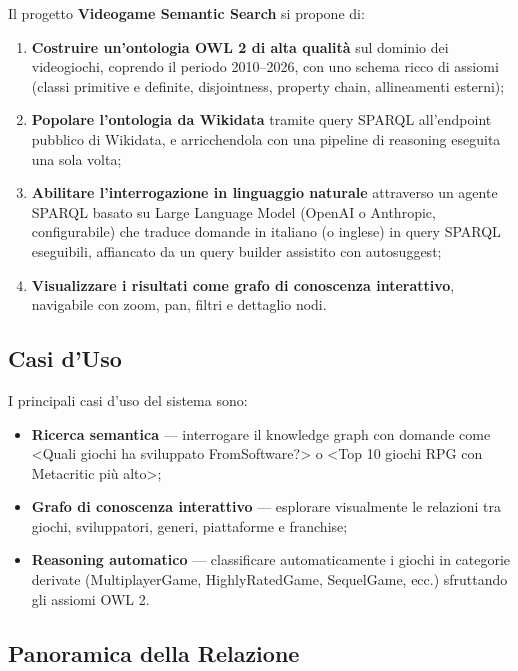 Il progetto \textbf{Videogame Semantic Search} si propone di:
\begin{enumerate}[nosep]
  \item \textbf{Costruire un'ontologia OWL 2 di alta qualit\`a} sul dominio dei videogiochi, coprendo il periodo 2010--2026, con uno schema ricco di assiomi (classi primitive e definite, disjointness, property chain, allineamenti esterni);
  \item \textbf{Popolare l'ontologia da Wikidata} tramite query SPARQL all'endpoint pubblico di Wikidata, e arricchendola con una pipeline di reasoning eseguita una sola volta;
  \item \textbf{Abilitare l'interrogazione in linguaggio naturale} attraverso un agente SPARQL basato su Large Language Model (OpenAI o Anthropic, configurabile) che traduce domande in italiano (o inglese) in query SPARQL eseguibili, affiancato da un query builder assistito con autosuggest;
  \item \textbf{Visualizzare i risultati come grafo di conoscenza interattivo}, navigabile con zoom, pan, filtri e dettaglio nodi.
\end{enumerate}

\subsection{Casi d'Uso}

I principali casi d'uso del sistema sono:
\begin{itemize}[nosep]
  \item \textbf{Ricerca semantica} --- interrogare il knowledge graph con domande come \textless{}Quali giochi ha sviluppato FromSoftware?\textgreater{} o \textless{}Top 10 giochi RPG con Metacritic pi\`u alto\textgreater{};
  \item \textbf{Grafo di conoscenza interattivo} --- esplorare visualmente le relazioni tra giochi, sviluppatori, generi, piattaforme e franchise;
  \item \textbf{Reasoning automatico} --- classificare automaticamente i giochi in categorie derivate (MultiplayerGame, HighlyRatedGame, SequelGame, ecc.) sfruttando gli assiomi OWL 2.
\end{itemize}

\subsection{Panoramica della Relazione}

